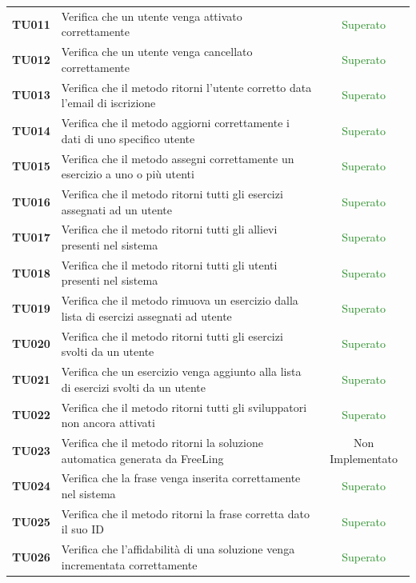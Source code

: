 \begin{tabularx}{\textwidth}{cXc}
	\textbf{TU011} & Verifica che un utente venga attivato correttamente & \textcolor{ForestGreen}{Superato} \\
	\textbf{TU012} & Verifica che un utente venga cancellato correttamente & \textcolor{ForestGreen}{Superato} \\
	\textbf{TU013} & Verifica che il metodo ritorni l'utente corretto data l'email di iscrizione & \textcolor{ForestGreen}{Superato} \\
	\textbf{TU014} & Verifica che il metodo aggiorni correttamente i dati di uno specifico utente & \textcolor{ForestGreen}{Superato} \\
	\textbf{TU015} & Verifica che il metodo assegni correttamente un esercizio a uno o più utenti & \textcolor{ForestGreen}{Superato} \\
	\textbf{TU016} & Verifica che il metodo ritorni tutti gli esercizi assegnati ad un utente & \textcolor{ForestGreen}{Superato} \\
	\textbf{TU017} & Verifica che il metodo ritorni tutti gli allievi presenti nel sistema & \textcolor{ForestGreen}{Superato} \\
	\textbf{TU018} & Verifica che il metodo ritorni tutti gli utenti presenti nel sistema & \textcolor{ForestGreen}{Superato} \\
	\textbf{TU019} & Verifica che il metodo rimuova un esercizio dalla lista di esercizi assegnati ad utente & \textcolor{ForestGreen}{Superato} \\
	\textbf{TU020} & Verifica che il metodo ritorni tutti gli esercizi svolti da un utente & \textcolor{ForestGreen}{Superato} \\
	\textbf{TU021} & Verifica che un esercizio venga aggiunto alla lista di esercizi svolti da un utente & \textcolor{ForestGreen}{Superato} \\
	\textbf{TU022} & Verifica che il metodo ritorni tutti gli sviluppatori non ancora attivati & \textcolor{ForestGreen}{Superato} \\
	\textbf{TU023} & Verifica che il metodo ritorni la soluzione automatica generata da FreeLing & Non Implementato \\
	\textbf{TU024} & Verifica che la frase venga inserita correttamente nel sistema & \textcolor{ForestGreen}{Superato} \\
	\textbf{TU025} & Verifica che il metodo ritorni la frase corretta dato il suo ID & \textcolor{ForestGreen}{Superato} \\
	\textbf{TU026} & Verifica che l'affidabilità di una soluzione venga incrementata correttamente & \textcolor{ForestGreen}{Superato} \\

\end{tabularx}
